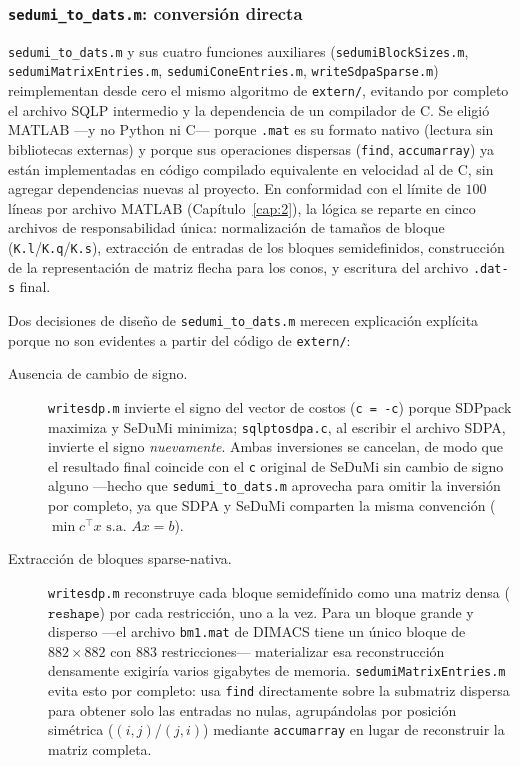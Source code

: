 \subsubsection{\texttt{sedumi\_to\_dats.m}: conversi\'on directa}

\texttt{sedumi\_to\_dats.m} y sus cuatro funciones auxiliares
(\texttt{sedumiBlockSizes.m}, \texttt{sedumiMatrixEntries.m},
\texttt{sedumiConeEntries.m}, \texttt{writeSdpaSparse.m}) reimplementan
desde cero el mismo algoritmo de \texttt{extern/}, evitando por completo el
archivo SQLP intermedio y la dependencia de un compilador de C. Se eligi\'o
MATLAB —y no Python ni C— porque \texttt{.mat} es su formato nativo (lectura
sin bibliotecas externas) y porque sus operaciones dispersas
(\texttt{find}, \texttt{accumarray}) ya est\'an implementadas en c\'odigo
compilado equivalente en velocidad al de C, sin agregar dependencias nuevas
al proyecto. En conformidad con el l\'imite de $100$ l\'ineas por archivo
MATLAB (Cap\'itulo~\ref{cap:2}), la l\'ogica se reparte en cinco archivos de
responsabilidad \'unica: normalizaci\'on de tama\~nos de bloque
(\texttt{K.l}/\texttt{K.q}/\texttt{K.s}), extracci\'on de entradas de los
bloques semidefinidos, construcci\'on de la representaci\'on de matriz
flecha para los conos, y escritura del archivo \texttt{.dat-s} final.

Dos decisiones de dise\~no de \texttt{sedumi\_to\_dats.m} merecen
explicaci\'on expl\'icita porque no son evidentes a partir del c\'odigo de
\texttt{extern/}:

\begin{description}
    \item[Ausencia de cambio de signo.] \texttt{writesdp.m} invierte el
    signo del vector de costos (\texttt{c = -c}) porque SDPpack maximiza y
    SeDuMi minimiza; \texttt{sqlptosdpa.c}, al escribir el archivo SDPA,
    invierte el signo \emph{nuevamente}. Ambas inversiones se cancelan, de
    modo que el resultado final coincide con el \texttt{c} original de
    SeDuMi sin cambio de signo alguno —hecho que \texttt{sedumi\_to\_dats.m}
    aprovecha para omitir la inversi\'on por completo, ya que SDPA y SeDuMi
    comparten la misma convenci\'on ($\min c^\top x \text{ s.a. } Ax=b$).
    \item[Extracci\'on de bloques sparse-nativa.] \texttt{writesdp.m}
    reconstruye cada bloque semidef\'inido como una matriz densa
    ($\mathtt{reshape}$) por cada restricci\'on, uno a la vez. Para un bloque
    grande y disperso —el archivo \texttt{bm1.mat} de DIMACS tiene un
    \'unico bloque de $882\times882$ con $883$ restricciones— materializar
    esa reconstrucci\'on densamente exigir\'ia varios gigabytes de memoria.
    \texttt{sedumiMatrixEntries.m} evita esto por completo: usa
    \texttt{find} directamente sobre la submatriz dispersa para obtener solo
    las entradas no nulas, agrup\'andolas por posici\'on sim\'etrica
    ($(i,j)$/$(j,i)$) mediante \texttt{accumarray} en lugar de reconstruir
    la matriz completa.
\end{description}

